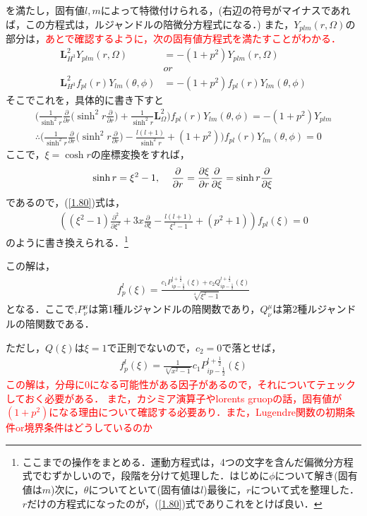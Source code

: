 を満たし，固有値$l,m$によって特徴付けられる，(右辺の符号がマイナスであれば，この方程式は，ルジャンドルの陪微分方程式になる．)
また，$Y_{plm}(r,\Omega)$の部分は，\textcolor{red}{あとで確認するように，次の固有値方程式を満たすことがわかる．}
\begin{align}
  \bm{L}_{H^3}^2Y_{plm}(r,\Omega)&=-(1+p^2)Y_{plm}(r,\Omega) \\
  &or \\
 \bm{L}_{H^3}^2f_{pl}(r)Y_{lm}(\theta,\phi)&=-(1+p^2)f_{pl}(r)Y_{lm}(\theta,\phi)
\end{align}
そこでこれを，具体的に書き下すと
\begin{align}
\biggl(\frac{1}{\sinh^2r}\frac{\partial}{\partial r}\biggl(\sinh^2r\frac{\partial}{\partial r}\biggr)+\frac{1}{\sinh^2r}\bm{L}_{\Omega}^2\biggr)f_{pl}(r)Y_{lm}(\theta,\phi)=-(1+p^2)Y_{plm} \\
\label{1.80}
\therefore\biggl(\frac{1}{\sinh^2r}\frac{\partial}{\partial r}\biggl(\sinh^2r\frac{\partial}{\partial r}\biggr)-\frac{l(l+1)}{\sinh^2r}+(1+p^2)\biggr)f_{pl}(r)Y_{lm}(\theta,\phi)=0
\end{align}
ここで，$\xi=\cosh r$の座標変換をすれば，
\begin{align}
  \sinh r=\xi^2 -1, \hspace{4mm} \frac{\partial}{\partial r}=\frac{\partial \xi}{\partial r}\frac{\partial}{\partial \xi}=\sinh r\frac{\partial}{\partial \xi}
\end{align}
であるので，(\ref{1.80})式は，
\begin{align}
  \label{1.81}
\left(\left(\xi^2-1\right)\frac{\partial^2}{\partial \xi^2}+3 x \frac{\partial}{\partial \xi}-\frac{l (l+1)}{\xi^2-1}+(p^2+1)\right)f_{pl}(\xi)=0
\end{align}
のように書き換えられる．\footnote{ここまでの操作をまとめる．運動方程式は，4つの文字を含んだ偏微分方程式でむずかしいので，段階を分けて処理した．はじめに$\phi$について解き(固有値は$m$)次に，$\theta$についてといて(固有値は$l$)最後に，$r$について式を整理した．$r$だけの方程式になったのが，(\ref{1.80})式でありこれをとけば良い．}

この解は，\begin{align}
  f^l_p(\xi)=\frac{c_1 P_{i p-\frac{1}{2}}^{l+\frac{1}{2}}(\xi)+c_2 Q_{i p-\frac{1}{2}}^{l+\frac{1}{2}}(\xi)}{\sqrt[4]{\xi^2-1}}
\end{align}
となる．ここで,$P^{\mu}_{\nu}$は第1種ルジャンドルの陪関数であり，$Q^{\mu}_{\nu}$は第2種ルジャンドルの陪関数である．

ただし，$Q(\xi)$は$\xi=1$で正則でないので，$c_2=0$で落とせば，
\begin{align}
  f^l_p(\xi)=\frac{1}{\sqrt[4]{x^2-1}}c_1 P_{i p-\frac{1}{2}}^{l+\frac{1}{2}}(\xi)
\end{align}
\textcolor{red}{この解は，分母に$0$になる可能性がある因子があるので，それについてテェックしておく必要がある．
また，カシミア演算子やlorents gruopの話，固有値が$(1+p^2)$になる理由について確認する必要あり．また，Lugendre関数の初期条件or境界条件はどうしているのか}
